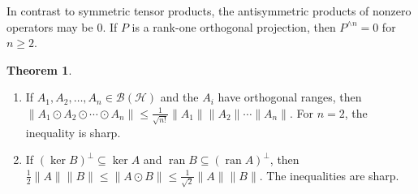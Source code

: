 \documentclass[10pt,reqno]{amsart}
\newcommand{\0}{{\color{lightgray}0}}
\renewcommand{\leq}{\leqslant}
\renewcommand{\geq}{\geqslant}
\newcommand{\ran}{\operatorname{ran}}
\newcommand{\norm}[1]{\| #1 \|}
\newcommand{\h}{\mathcal{H}}
\theoremstyle{definition}
\newtheorem{Theorem}[equation]{Theorem}
\numberwithin{equation}{section}
\begin{document}
In contrast to symmetric tensor products, the antisymmetric products of nonzero operators may be $0$.
If $P$ is a rank-one orthogonal projection, then $P^{\wedge n} = 0$ for $n\geq 2$.

\begin{Theorem}\label{already}
\begin{enumerate}
    \item If $A_1, A_2,  \ldots, A_n \in \mathcal{B} ( \h) $ and the $A_i$ have orthogonal ranges, then 
    $\norm{A_1 \odot A_2 \odot \cdots \odot A_n} \leq \frac{1}{\sqrt{n!}}\norm{A_1}\norm{A_2} \cdots \norm{A_n}$.
For $n=2$, the inequality is sharp.
\item If  $(\ker B)^\perp \subseteq \ker A$ and $\ran B \subseteq (\ran A)^\perp$, then
$\frac{1}{2}\|A\|\|B\| \leq\|A \odot B\| \leq\frac{1}{\sqrt{2}}\norm{A}\norm{B}$.
The inequalities are sharp.
\end{enumerate}
\end{Theorem}
\end{document}

